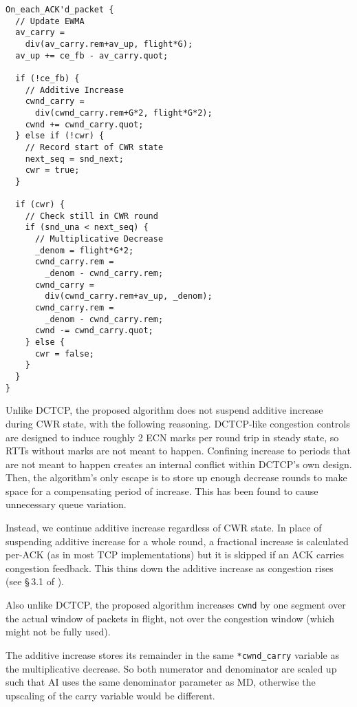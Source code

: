 \begin{verbatim}
On_each_ACK'd_packet {
  // Update EWMA
  av_carry = 
    div(av_carry.rem+av_up, flight*G);
  av_up += ce_fb - av_carry.quot;

  if (!ce_fb) {
    // Additive Increase
    cwnd_carry = 
      div(cwnd_carry.rem+G*2, flight*G*2);
    cwnd += cwnd_carry.quot;
  } else if (!cwr) {
    // Record start of CWR state
    next_seq = snd_next;
    cwr = true;
  }

  if (cwr) {
    // Check still in CWR round
    if (snd_una < next_seq) {
      // Multiplicative Decrease
      _denom = flight*G*2;
      cwnd_carry.rem = 
        _denom - cwnd_carry.rem;
      cwnd_carry = 
        div(cwnd_carry.rem+av_up, _denom);
      cwnd_carry.rem = 
        _denom - cwnd_carry.rem;
      cwnd -= cwnd_carry.quot;
    } else {
      cwr = false;
    }
  }
}
\end{verbatim}

Unlike DCTCP, the proposed algorithm does not suspend additive increase during
CWR state, with the following reasoning. DCTCP-like congestion controls are
designed to induce roughly 2 ECN marks per round trip in steady state, so RTTs
without marks are not meant to happen. Confining increase to periods that are
not meant to happen creates an internal conflict within DCTCP's own design.
Then, the algorithm's only escape is to store up enough decrease rounds to make
space for a compensating period of increase. This has been found to cause
unnecessary queue variation.

Instead, we continue additive increase regardless of CWR state. In place of
suspending additive increase for a whole round, a fractional increase is
calculated per-ACK (as in most TCP implementations) but it is skipped if an ACK
carries congestion feedback. This thins down the additive increase as congestion
rises (see \S\,3.1 of \cite{Briscoe17a:CC_Tensions_TR}).

Also unlike DCTCP, the proposed algorithm increases \texttt{cwnd} by one segment
over the actual window of packets in flight, not over the congestion window
(which might not be fully used).

The additive increase stores its remainder in the same \texttt{*cwnd\_carry}
variable as the multiplicative decrease. So both numerator and denominator are
scaled up such that AI uses the same denominator parameter as MD, otherwise the
upscaling of the carry variable would be different.

